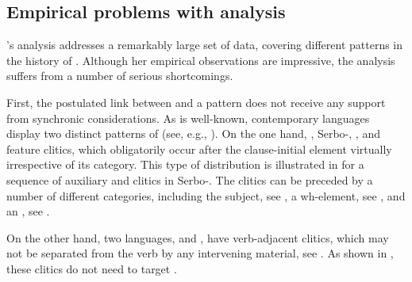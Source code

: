 \documentclass[output=paper,modfonts,newtxmath,hidelinks]{langscibook}
\begin{document}
\subsection{Empirical problems with  analysis}\label{11:s2.2}

\citeauthor{pancheva2005}’s analysis addresses a remarkably large set of data, covering different  patterns in the history of . Although her empirical observations are impressive, the analysis suffers from a number of serious shortcomings. 

First, the postulated link between  and a  pattern does not receive any support from synchronic considerations. As is well-known, contemporary  languages display two distinct patterns of  (see, e.g., \citealt{Franks-King2000}). On the one hand, , Serbo-, , and  feature  clitics, which obligatorily occur after the clause-initial element virtually irrespective of its category. This type of  distribution is illustrated in  for a sequence of auxiliary and  clitics in Serbo-. The clitics can be preceded by a number of different categories, including the subject, see , a wh-element, see , and an , see . 

\ea \label{11:ex6}
	 \label{11:ex6a}
    \label{11:ex6b}
    \label{11:ex6c}
	\z
\z
On the other hand, two  languages,  and , have verb-adjacent clitics, which may not be separated from the verb by any intervening material, see . As shown in , these clitics do not need to target . 
\end{document}
